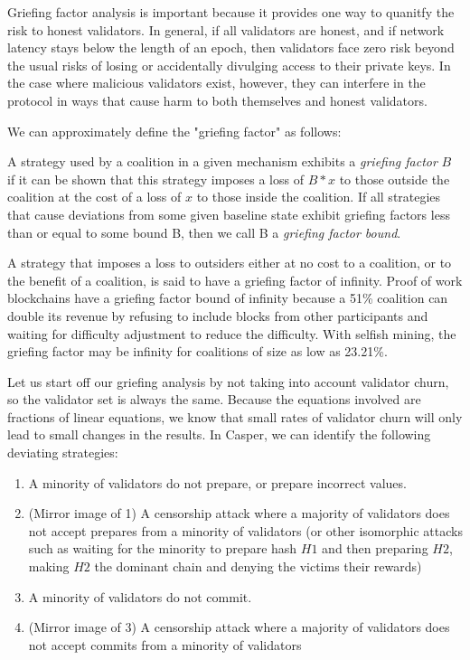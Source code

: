 \documentclass[12pt]{article}
\begin{document}
Griefing factor analysis is important because it provides one way to quanitfy the risk to honest validators. In general, if all validators are honest, and if network latency stays below the length of an epoch, then validators face zero risk beyond the usual risks of losing or accidentally divulging access to their private keys. In the case where malicious validators exist, however, they can interfere in the protocol in ways that cause harm to both themselves and honest validators.

We can approximately define the "griefing factor" as follows:

A strategy used by a coalition in a given mechanism exhibits a \textit{griefing factor} $B$ if it can be shown that this strategy imposes a loss of $B * x$ to those outside the coalition at the cost of a loss of $x$ to those inside the coalition. If all strategies that cause deviations from some given baseline state exhibit griefing factors less than or equal to some bound B, then we call B a \textit{griefing factor bound}.

A strategy that imposes a loss to outsiders either at no cost to a coalition, or to the benefit of a coalition, is said to have a griefing factor of infinity. Proof of work blockchains have a griefing factor bound of infinity because a 51\% coalition can double its revenue by refusing to include blocks from other participants and waiting for difficulty adjustment to reduce the difficulty. With selfish mining, the griefing factor may be infinity for coalitions of size as low as 23.21\%.

Let us start off our griefing analysis by not taking into account validator churn, so the validator set is always the same. Because the equations involved are fractions of linear equations, we know that small rates of validator churn will only lead to small changes in the results. In Casper, we can identify the following deviating strategies:

\begin{enumerate}
\item A minority of validators do not prepare, or prepare incorrect values.
\item (Mirror image of 1) A censorship attack where a majority of validators does not accept prepares from a minority of validators (or other isomorphic attacks such as waiting for the minority to prepare hash $H1$ and then preparing $H2$, making $H2$ the dominant chain and denying the victims their rewards)
\item A minority of validators do not commit.
\item (Mirror image of 3) A censorship attack where a majority of validators does not accept commits from a minority of validators
\end{enumerate}
\end{document}
